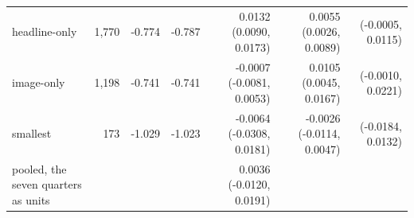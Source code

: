 \begin{tabular}{lrrrrrr}
headline-only & 1,770 & -0.774 & -0.787 & 0.0132 (0.0090, 0.0173) & 0.0055 (0.0026, 0.0089) & (-0.0005, 0.0115) \\
image-only & 1,198 & -0.741 & -0.741 & -0.0007 (-0.0081, 0.0053) & 0.0105 (0.0045, 0.0167) & (-0.0010, 0.0221) \\
smallest & 173 & -1.029 & -1.023 & -0.0064 (-0.0308, 0.0181) & -0.0026 (-0.0114, 0.0047) & (-0.0184, 0.0132) \\
pooled, the seven quarters as units &  &  &  & 0.0036 (-0.0120, 0.0191) &  &  \\
\bottomrule
\end{tabular}

